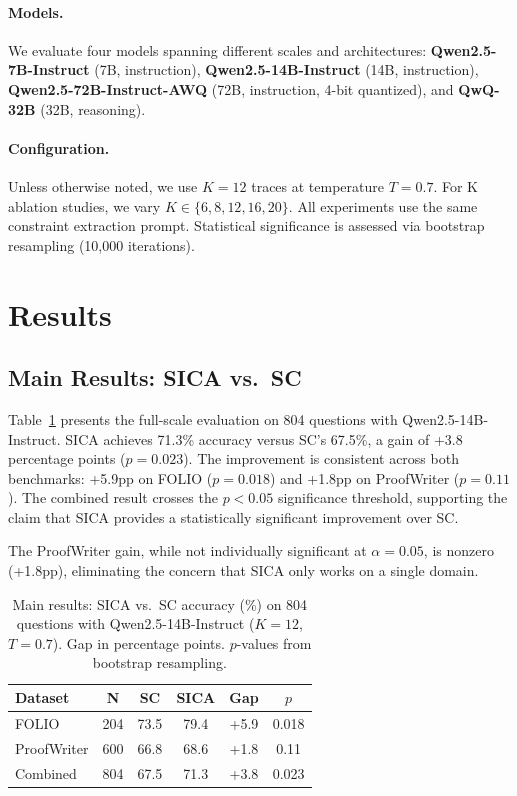 \documentclass[11pt,a4paper]{article}
\begin{document}
\paragraph{Models.}
We evaluate four models spanning different scales and architectures:
\textbf{Qwen2.5-7B-Instruct} (7B, instruction),
\textbf{Qwen2.5-14B-Instruct} (14B, instruction),
\textbf{Qwen2.5-72B-Instruct-AWQ} (72B, instruction, 4-bit quantized), and
\textbf{QwQ-32B} (32B, reasoning).

\paragraph{Configuration.}
Unless otherwise noted, we use $K=12$ traces at temperature $T=0.7$.
For K ablation studies, we vary $K \in \{6, 8, 12, 16, 20\}$.
All experiments use the same constraint extraction prompt.
Statistical significance is assessed via bootstrap resampling (10,000 iterations).


\section{Results}
\label{sec:results}

\subsection{Main Results: SICA vs.\ SC}
\label{sec:main_results}

Table~\ref{tab:main} presents the full-scale evaluation on 804 questions with Qwen2.5-14B-Instruct.
SICA achieves 71.3\% accuracy versus SC's 67.5\%, a gain of +3.8 percentage points ($p = 0.023$).
The improvement is consistent across both benchmarks: +5.9pp on FOLIO ($p = 0.018$) and +1.8pp on ProofWriter ($p = 0.11$).
The combined result crosses the $p < 0.05$ significance threshold, supporting the claim that SICA provides a statistically significant improvement over SC.

The ProofWriter gain, while not individually significant at $\alpha = 0.05$, is nonzero (+1.8pp), eliminating the concern that SICA only works on a single domain.

\begin{table}[t]
\centering
\small
\begin{tabular}{lccccc}
\toprule
\textbf{Dataset} & \textbf{N} & \textbf{SC} & \textbf{SICA} & \textbf{Gap} & \textbf{$p$} \\
\midrule
FOLIO        & 204 & 73.5 & 79.4 & +5.9 & 0.018 \\
ProofWriter  & 600 & 66.8 & 68.6 & +1.8 & 0.11  \\
\midrule
Combined     & 804 & 67.5 & 71.3 & +3.8 & 0.023 \\
\bottomrule
\end{tabular}
\caption{Main results: SICA vs.\ SC accuracy (\%) on 804 questions with Qwen2.5-14B-Instruct ($K\!=\!12$, $T\!=\!0.7$). Gap in percentage points. $p$-values from bootstrap resampling.}
\label{tab:main}
\end{table}
\end{document}
